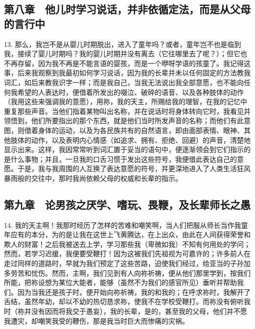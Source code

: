 \subsection{第八章　他儿时学习说话，并非依循定法，而是从父母的言行中}

13. 那么，我岂不是从婴儿时期脱出，进入了童年吗？或者，童年岂不也是临到我，接续了婴儿时期吗？我的婴儿时期并没有离去（它往哪里去了呢？）；但它也不再存留，因为我不再是不能言语的婴孩，而是一个咿呀学语的孩童了。我记得这事，后来我观察到我最初如何学习说话，因为我的长辈并未以任何固定的方法教我词汇，如后来教我识字一样；而是我自己，当我无法说出我全部意愿，也不能向任何我希望的人表达时，便借着所发出的啜泣、破碎的语音、以及各种肢体的动作（我用这些来强调我的意愿），用祢，我的天主，所赐给我的理智，在我的记忆中重复那些声音。当他们指着某物叫出名称，并在说话时将身体转向它时，我看见并领悟到，他们所要指出的那个东西，就是他们当时所发声音的名称；而他们有此意图，则借着身体的运动，以及为各民族共有的自然语言，即由面部表情、眼神、其他肢体的动作，以及表明内心情感（如追求、拥有、拒绝、回避）的声音，清楚地显示出来。这样，我因常常听到词汇置于妥当的语句中，便逐渐领会到它们指示的是什么事物；并且，一旦我的口舌习惯于发出这些符号，我便借此表达自己的意愿。于是，我与我周围的人互换了表达意愿的符号，并更深地进入了人类生活狂风暴雨般的交往中，那时我尚依赖父母的权威和长辈的指示。\par


\subsection{第九章　论男孩之厌学、嗜玩、畏鞭，及长辈师长之愚}

14. 我的天主啊！我那时经历了怎样的苦难和嘲笑啊，当人们把服从师长当作我童年应有的本分，为的是让我在这世上飞黄腾达，在上出众，由此在人间获得荣誉和欺人的财富！之后我被送去上学，学习那些我（卑微如我）不知有何用处的学问；然而，若学习迟缓，我便要受鞭打！因为这被我们先祖视为可嘉许的；许多前人在走过同样的道路时，早就为我们预定了这些苦路，迫使我们经过，给亚当的子孙加多劳苦和忧伤。然而，主啊，我们见到有人向祢祈祷，便从他们那里学到，按我们所能，把祢设想为某位大能者，能够（虽然不为我们的感官所见）垂听并帮助我们。因为当我还是孩子时，便开始向祢祈祷，我的和我的；在呼求祢时，我解开了舌结，虽然年幼，却以不幼的热切恳求祢，使我不在学校受鞭打。而祢没有俯听我时（祢并没有因而将我交于愚妄），我的长辈，是的，甚至我的父母，他们并不愿我遭灾，却嘲笑我受的鞭伤，那是我当时巨大而惨痛的灾祸。\par

